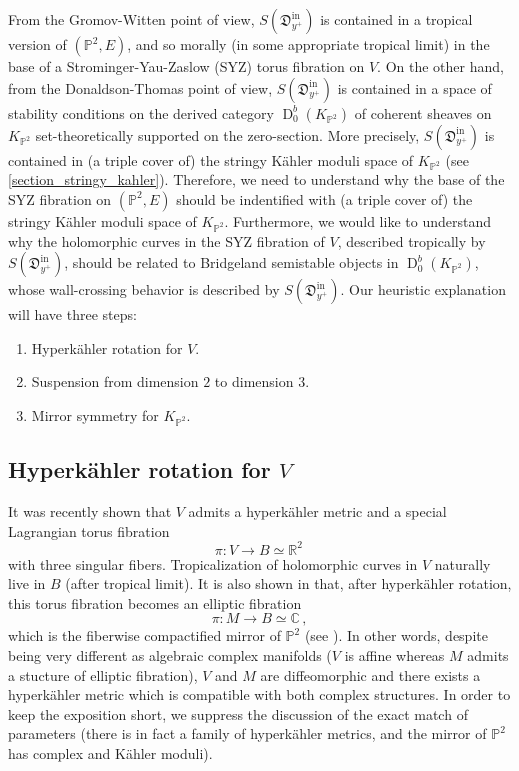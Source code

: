 \documentclass[11pt,letterpaper]{amsart}
\newcommand\C{\mathbb C}
\newcommand\PP{\mathbb P}
\newcommand\R{\mathbb R}
\newcommand\fD{\mathfrak D}
\newcommand\D{\operatorname{D}}
\newcommand\iin{\mathrm{in}}
\begin{document}
From the Gromov-Witten point of view,  $S(\fD^{\iin}_{y^+})$ is contained in
 a tropical version of 
$(\PP^2,E)$, and so morally (in some appropriate tropical limit) in the base of a Strominger-Yau-Zaslow (SYZ) torus fibration on $V$. On the other hand, from the Donaldson-Thomas point of view, $S(\fD^{\iin}_{y^+})$ is contained in a space of stability conditions on the derived category $\D^b_0(K_{\PP^2})$ of coherent sheaves on $K_{\PP^2}$
set-theoretically supported on the zero-section.
More precisely, $S(\fD^{\iin}_{y^+})$ is contained in (a triple cover of) the stringy Kähler moduli space of $K_{\PP^2}$ (see \cref{section_stringy_kahler}).
Therefore, we need to understand why the base of the SYZ fibration on $(\PP^2,E)$ should be indentified with (a triple cover of) the stringy Kähler moduli space of $K_{\PP^2}$.
Furthermore, we would like to understand why the holomorphic curves in the SYZ fibration of $V$, described tropically by 
$S(\fD^{\iin}_{y^+})$, should be related to 
Bridgeland semistable objects in 
$\D^b_0(K_{\PP^2})$, whose wall-crossing behavior is described by $S(\fD^{\iin}_{y^+})$.
Our heuristic explanation will have three steps:
\begin{enumerate}
    \item Hyperkähler rotation for $V$.
    \item Suspension from dimension $2$ to dimension $3$.
    \item Mirror symmetry for $K_{\PP^2}$.
\end{enumerate}

\subsection{Hyperkähler rotation for $V$}
It was recently shown \cite{collins2019special}
that $V$ admits a hyperkähler metric and a
special Lagrangian torus fibration
\[ \pi \colon V \rightarrow B \simeq \R^2\,\] with three singular fibers. 
Tropicalization of holomorphic curves in $V$ naturally live in $B$ (after tropical limit). 
It is also shown in \cite{collins2019special} that, after hyperkähler rotation, this torus fibration becomes
an elliptic fibration 
\[ \pi \colon M \rightarrow B \simeq \C\,,\] 
which is the fiberwise compactified mirror of $\PP^2$
(see \cite[\S 3.1]{MR2257391}).
In other words, despite being very different as algebraic complex manifolds 
($V$ is affine whereas $M$ admits a stucture of elliptic fibration), 
$V$ and $M$ are diffeomorphic and there exists a hyperkähler metric which is compatible with both complex structures.
In order to keep the exposition short, 
we suppress the discussion of the exact match of parameters 
(there is in fact a family of hyperkähler metrics, and the mirror of 
$\PP^2$ has complex and K\"ahler moduli).
\end{document}
